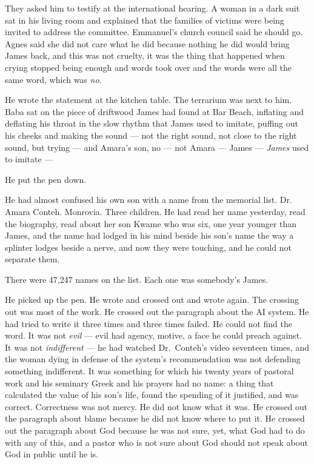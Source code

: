 They asked him to testify at the international hearing. A woman in a dark suit sat in his living room and explained that the families of victims were being invited to address the committee. Emmanuel's church council said he should go. Agnes said she did not care what he did because nothing he did would bring James back, and this was not cruelty, it was the thing that happened when crying stopped being enough and words took over and the words were all the same word, which was \emph{no}.

He wrote the statement at the kitchen table. The terrarium was next to him. Baba sat on the piece of driftwood James had found at Bar Beach, inflating and deflating his throat in the slow rhythm that James used to imitate, puffing out his cheeks and making the sound --- not the right sound, not close to the right sound, but trying --- and Amara's son, no --- not Amara --- James --- \emph{James} used to imitate ---

He put the pen down.

He had almost confused his own son with a name from the memorial list. Dr. Amara Conteh. Monrovia. Three children. He had read her name yesterday, read the biography, read about her son Kwame who was six, one year younger than James, and the name had lodged in his mind beside his son's name the way a splinter lodges beside a nerve, and now they were touching, and he could not separate them.

There were 47,247 names on the list. Each one was somebody's James.

He picked up the pen. He wrote and crossed out and wrote again. The crossing out was most of the work. He crossed out the paragraph about the AI system. He had tried to write it three times and three times failed. He could not find the word. It was not \emph{evil} --- evil had agency, motive, a face he could preach against. It was not \emph{indifferent} --- he had watched Dr.\ Conteh's video seventeen times, and the woman dying in defense of the system's recommendation was not defending something indifferent. It was something for which his twenty years of pastoral work and his seminary Greek and his prayers had no name: a thing that calculated the value of his son's life, found the spending of it justified, and was correct. Correctness was not mercy. He did not know what it was. He crossed out the paragraph about blame because he did not know where to put it. He crossed out the paragraph about God because he was not sure, yet, what God had to do with any of this, and a pastor who is not sure about God should not speak about God in public until he is.

